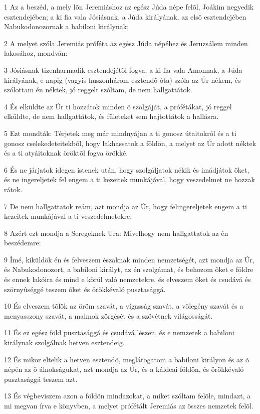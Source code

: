 \par 1 Az a beszéd, a mely lõn Jeremiáshoz az egész Júda népe felõl, Joákim negyedik esztendejében; a ki fia vala Jósiásnak, a Júda királyának, az elsõ esztendejében Nabukodonozornak a babiloni királynak;
\par 2 A melyet szóla Jeremiás próféta az egész Júda népéhez és Jeruzsálem minden lakosához, mondván:
\par 3 Jósiásnak tizenharmadik esztendejétõl fogva, a ki fia vala Amonnak, a Júda királyának, e napig (vagyis huszonhárom esztendõ óta) szóla az Úr nékem, és szólottam én néktek, jó reggelt szóltam, de nem hallgattátok.
\par 4 És elküldte az Úr ti hozzátok minden õ szolgáját, a prófétákat, jó reggel elküldte, de nem hallgattátok, és fületeket sem hajtottátok a hallásra.
\par 5 Ezt mondták: Térjetek meg már mindnyájan a ti gonosz útaitokról és a ti gonosz cselekedeteitekbõl, hogy lakhassatok a földön, a melyet az Úr adott néktek és a ti atyáitoknak öröktõl fogva örökké.
\par 6 És ne járjatok idegen istenek után, hogy szolgáljatok nékik és imádjátok õket, és ne ingereljetek fel engem a ti kezeitek munkájával, hogy veszedelmet ne hozzak rátok.
\par 7 De nem hallgattatok reám, azt mondja az Úr, hogy felingereljetek engem a ti kezeitek munkájával a ti veszedelmetekre.
\par 8 Azért ezt mondja a Seregeknek Ura: Mivelhogy nem hallgattatok az én beszédemre:
\par 9 Ímé, kiküldök én és felveszem északnak minden nemzetségét, azt mondja az Úr, és Nabukodonozort, a babiloni királyt, az én szolgámat, és behozom õket e földre és ennek lakóira és mind e körül való nemzetekre, és elveszem õket és csudává és szörnyûséggé teszem õket és  örökkévaló pusztasággá.
\par 10 És elveszem tõlök az öröm szavát, a vígasság szavát, a võlegény szavát és a menyasszony szavát, a malmok zörgését és a szövétnek világosságát.
\par 11 És ez egész föld pusztasággá és csudává lészen, és e nemzetek a babiloni királynak szolgálnak hetven esztendeig.
\par 12 És mikor eltelik a hetven esztendõ, meglátogatom a babiloni királyon és az õ népén az õ álnokságukat, azt mondja az Úr, és a káldeai földön, és örökkévaló pusztasággá teszem azt.
\par 13 És végbeviszem azon a földön mindazokat, a miket szóltam felõle, mindazt, a mi megvan írva e könyvben, a melyet prófétált Jeremiás az összes nemzetek felõl.
